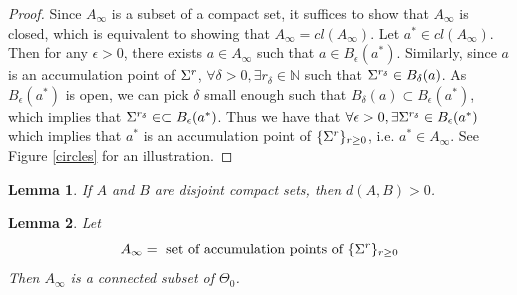 \documentclass[12pt, leqno]{article}
\def\s{\ensuremath\Sigma}
\newtheorem{lemma}{Lemma}[]
\begin{document}
\begin{proof}
Since $A_{\infty}$ is a subset of a compact set, it suffices to show
that $A_{\infty}$ is closed, which is equivalent to showing that
$A_{\infty } = cl(A_{\infty})$. Let  $a^* \in cl(A_{\infty})$. Then for
any $\epsilon > 0$, there exists $a \in A_{\infty}$ such that $a \in
B_{\epsilon}(a^*)$. Similarly, since $a$ is an accumulation point of
$\s^r$, $\forall \delta >0, \exists r_{\delta} \in \mathbb{N}$ such
that $\s^{r_{\delta}} \in B_{\delta}(a)$. As $B_{\epsilon}(a^*)$ is
open, we can pick $\delta$ small enough such that $B_{\delta}(a)
\subset B_{\epsilon}(a^*)$, which implies that $\s^{r_{\delta}} \in
\subset B_{\epsilon}(a^*)$. Thus we have that $\forall \epsilon>0,
\exists \s^{r_{\delta}} \in B_{\epsilon}(a^*)$ which implies that
$a^*$ is an accumulation point of $\{\s^{r}\}_{r \geq 0}$, i.e. $a^*
\in A_{\infty}$. See Figure \ref{circles} for an illustration.
\end{proof}
\begin{lemma} 
If $A$ and $B$ are disjoint compact sets, then $d(A,B)>0$.
\end{lemma}
\begin{lemma} 
Let 
\[
A_{\infty} = \text{ set of accumulation points of } \{\s^r\}_{r \geq 0}
\]
Then $A_{\infty}$ is a connected subset of $\Theta_0$.
\end{lemma}
\end{document}
